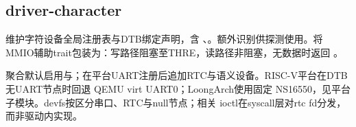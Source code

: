 
\subsection{driver-character}

维护字符设备全局注册表与DTB绑定声明，含 、。额外识别供探测使用。将 MMIO辅助trait包装为：写路径阻塞至THRE，读路径非阻塞，无数据时返回 。

聚合默认启用与；在平台UART注册后追加RTC与语义设备。RISC-V平台在DTB无UART节点时回退 QEMU virt UART0；LoongArch使用固定  NS16550，见平台  子模块。devfs按区分串口、RTC与null节点；相关 ioctl在syscall层对rtc fd分发，而非驱动内实现。





